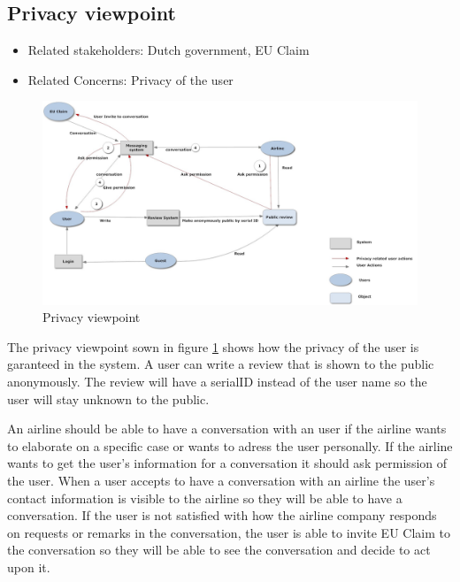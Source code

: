 % 

\subsection{Privacy viewpoint}

\begin{itemize}
\item Related stakeholders: Dutch government, EU Claim
\item Related Concerns: Privacy of the user
\end{itemize}

\newpage
\begin{landscape}
\begin{figure}
\includegraphics[width=600px]{privacyview}
\caption{Privacy viewpoint}
\label{fig:privacy}
\end{figure}
\end{landscape}

The privacy viewpoint sown in figure \ref{fig:privacy} shows how the privacy of the user is garanteed in the system. A user can write a review that is shown to the public anonymously. The review will have a serialID instead of the user name so the user will stay unknown to the public. 

An airline should be able to have a conversation with an user if the airline wants to elaborate on a specific case or wants to adress the user personally. If the airline wants to get the user's information for a conversation it should ask permission of the user. When a user accepts to have a conversation with an airline the user's contact information is visible to the airline so they will be able to have a conversation. If the user is not satisfied with how the airline company responds on requests or remarks in the conversation, the user is able to invite EU Claim to the conversation so they will be able to see the conversation and decide to act upon it.